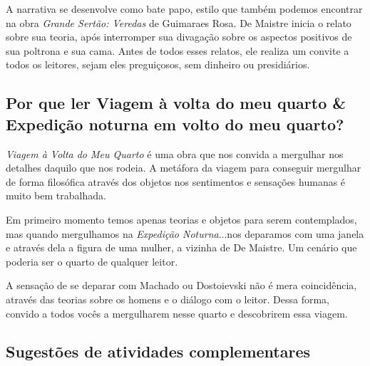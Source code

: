 \documentclass[12pt]{extarticle}
\begin{document}
A narrativa se desenvolve como bate papo, estilo que também podemos
encontrar na obra \textit{Grande Sertão: Veredas} de Guimaraes Rosa. De
Maistre inicia o relato sobre sua teoria, após interromper sua divagação
sobre os aspectos positivos de sua poltrona e sua cama. Antes de todos
esses relatos, ele realiza um convite a todos os leitores, sejam eles
preguiçosos, sem dinheiro ou presidiários.




\subsection{Por que ler Viagem à volta do meu quarto \& Expedição noturna em
volto do meu quarto?}

\emph{Viagem à Volta do Meu Quarto} é uma obra que nos convida a
mergulhar nos detalhes daquilo que nos rodeia. A metáfora da viagem para
conseguir mergulhar de forma filosófica através dos objetos nos
sentimentos e sensações humanas é muito bem trabalhada.

Em primeiro momento temos apenas teorias e objetos para serem
contemplados, mas quando mergulhamos na \emph{Expedição Noturna}...nos
deparamos com uma janela e através dela a figura de uma mulher, a
vizinha de De Maistre. Um cenário que poderia ser o quarto de qualquer
leitor.

A sensação de se deparar com Machado ou Dostoievski não é mera
coincidência, através das teorias sobre os homens e o diálogo com o
leitor. Dessa forma, convido a todos vocês a mergulharem nesse quarto e
descobrirem essa viagem.






\subsection{Sugestões de atividades complementares}

\end{document}
